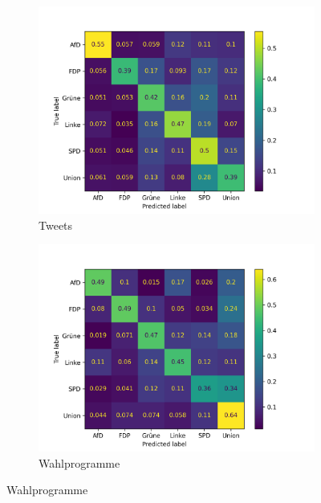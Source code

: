 \begin{figure}[H]
    \centering
    \begin{subfigure}{0.49\textwidth}
        \includegraphics[width=\textwidth]{data/images/modeling/cnn/none/tweets_confusion_matrix.png}
        \caption{Tweets}
        \label{sfig:confusionMatrixCnnTweetsUnbalanced}
    \end{subfigure}
    \hfill
    \begin{subfigure}{0.49\textwidth}
        \includegraphics[width=\textwidth]{data/images/modeling/cnn/none/party_programs_confusion_matrix.png}
        \caption{Wahlprogramme}
        \label{sfig:confusionMatrixCnnManifestUnbalanced}
    \end{subfigure}

\end{figure}
